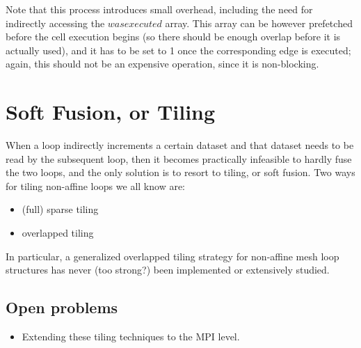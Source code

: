 \documentclass[a4paper]{article}
\begin{document}
Note that this process introduces small overhead, including the need for indirectly accessing the $wasexecuted$ array. This array can be however prefetched before the cell execution begins (so there should be enough overlap before it is actually used), and it has to be set to 1 once the corresponding edge is executed; again, this should not be an expensive operation, since it is non-blocking.

\section{Soft Fusion, or Tiling}
When a loop indirectly increments a certain dataset and that dataset needs to be read by the subsequent loop, then it becomes practically infeasible to hardly fuse the two loops, and the only solution is to resort to tiling, or soft fusion. Two ways for tiling non-affine loops we all know are:
\begin{itemize}
\item (full) sparse tiling
\item overlapped tiling
\end{itemize}
In particular, a generalized overlapped tiling strategy for non-affine mesh loop structures has never (too strong?) been implemented or extensively studied.
\subsection{Open problems}
\begin{itemize}
\item Extending these tiling techniques to the MPI level.
\end{itemize}

%
%
\end{document}
